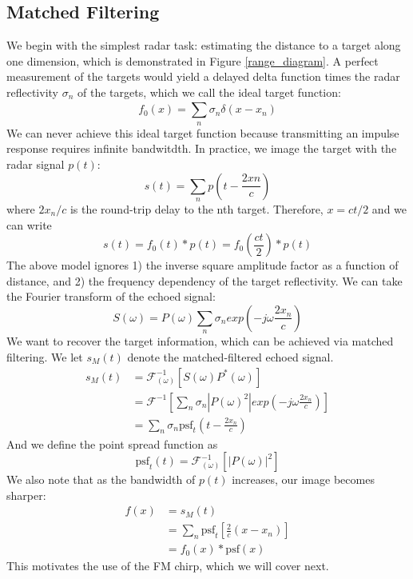 \documentclass{article}
\begin{document}
\subsection*{Matched Filtering}
\indent \indent
We begin with the simplest radar task: estimating the distance to a target along one dimension, which is demonstrated in Figure \ref{range_diagram}. A perfect measurement of the targets would yield a delayed delta function times the radar reflectivity \( \sigma_{n} \) of the targets, which we call the ideal target function:
\begin{displaymath}
	f_0(x) = \sum\limits_{n}^{} \sigma_{n} \delta(x - x_{n})  
\end{displaymath}
We can never achieve this ideal target function because transmitting an impulse response requires infinite bandwitdth. In practice, we image the target with the radar signal \( p(t) \):
\begin{displaymath}
	s(t) = \sum\limits_{n}^{} p(t - \frac{2 xn}{c}) 
\end{displaymath}
where \( 2 x_{n} / c\) is the round-trip delay to the nth target. Therefore, \( x = ct/2 \) and we can write 
\begin{displaymath}
	s(t) = f_0(t) * p(t) = f_0(\frac{ct}{2}) * p(t)  
\end{displaymath}
The above model ignores 1) the inverse square amplitude factor as a function of distance, and 2) the frequency dependency of the target reflectivity.
We can take the Fourier transform of the echoed signal:
\begin{displaymath}
	S(\omega) = P(\omega) \sum\limits_{n}^{} \sigma_{n}exp(-j \omega \frac{2 x_{n}}{c}) 
\end{displaymath}
We want to recover the target information, which can be achieved via matched filtering. We let \( s_{M}(t) \) denote the matched-filtered echoed signal.
\begin{align*}
	s_{M}(t) &= \mathcal{F}^{-1}_{( \omega )} [S(\omega) P^{*}(\omega) ] \\
			 &= \mathcal{F}^{-1} \left[ \sum\limits_{n}^{} \sigma_{n} | P(\omega)^2 | exp\left( -j \omega \frac{2 x_{n}}{c} \right) \right] \\
			 &= \sum\limits_{n}^{} \sigma_{n} \text{psf}_{t} \left(t - \frac{2 x_{n}}{c} \right) 
\end{align*}
And we define the point spread function as
\begin{displaymath}
	\text{psf}_{t}(t) = \mathcal{F}^{-1}_{( \omega )} \left[|P(\omega) |^2 \right]
\end{displaymath}
We also note that as the bandwidth of \( p(t) \) increases, our image becomes sharper:
\begin{align*}
	f(x) &= s_{M}(t) \\
		 &= \sum\limits_{n}^{} \text{psf}_{t} \left[ \frac{2}{c}(x - x_{n}) \right] \\
		 &= f_{0}(x) * \text{psf}(x) 
\end{align*}
This motivates the use of the FM chirp, which we will cover next.
\end{document}
